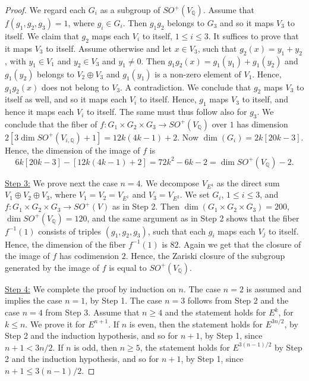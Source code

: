 \documentclass[12pt]{amsart}
\numberwithin{equation}{subsection}
\theoremstyle{plain}
\theoremstyle{definition}
\newcommand{\QQ}{{\mathbb Q}}
\newcommand{\ZZ}{{\mathbb Z}}
\newcommand{\Spin}{{\rm Spin}}
\begin{document}
\begin{proof}
We regard each $G_i$ as a subgroup of $SO^+(V_\QQ)$.
Assume that $f(g_1,g_2,g_3)=1$, where $g_i\in G_i$. Then $g_1g_2$ belongs to 
$G_3$ and so it maps $V_3$ to itself. We claim that $g_2$ maps each $V_i$ to itself, $1\leq i\leq 3$.
It suffices to prove that it maps $V_3$ to itself. Assume otherwise and let $x\in V_3$, such that $g_2(x)=y_1+y_2$, with $y_1\in V_1$ and $y_2\in V_3$ and $y_1\neq 0$. Then $g_1g_2(x)=g_1(y_1)+g_1(y_2)$ and $g_1(y_2)$ belongs to $V_2\oplus V_3$ and $g_1(y_1)$ is a non-zero element of $V_1$. Hence, $g_1g_2(x)$ does not belong to $V_3$. A contradiction. We conclude that $g_2$ maps $V_3$ to itself as well, and so it maps each $V_i$ to itself. Hence, $g_1$ maps $V_3$ to itself, and hence it maps each $V_i$ to itself.
The same must thus follow also for $g_3$. We conclude that the fiber of $f:{G}_1\times{G}_2\times{G}_3\rightarrow SO^+(V_\QQ)$ over $1$ 
has dimension $2[3\dim SO^+(V_{i,\QQ})+1]=12k(4k-1)+2$. Now $\dim({G}_i)=2k[20k-3]$. Hence, the dimension of the image of $f$ is
\[
6k[20k-3]-[12k(4k-1)+2]=72k^2-6k-2=\dim SO^+(V_\QQ)-2.
\]

\underline{Step 3:} We  prove next the case $n=4$.
We decompose $V_{E^4}$ as the direct sum $V_1\oplus V_2\oplus V_3$, where $V_1=V_2=V_{E^1}$ and $V_3=V_{E^2}$.
We set $G_i$, $1\leq i\leq 3$, and $f:G_1\times G_2\times G_3\rightarrow SO^+(V)$ as in Step 2. Then
$\dim({G}_1\times {G}_2 \times {G}_3)=200,$
$\dim SO^+(V_\QQ)=120$, and the same argument as in Step 2 shows that the 
fiber $f^{-1}(1)$ consists of triples $(g_1,g_2,g_3)$, such that each $g_i$ maps each $V_j$ to itself. Hence, the 
dimension of the fiber $f^{-1}(1)$ is $82$. Again we get that the closure of the image of $f$ has codimension $2$. Hence, 
the Zariski closure of the subgroup generated by the image of $f$ is equal to $SO^+(V_\QQ)$. 

\underline{Step 4:} We complete the proof by induction on $n$. The case $n=2$ is assumed and implies the case $n=1$, by Step 1.
The case $n=3$ follows from Step 2 and the case $n=4$ from Step 3. Assume that $n\geq 4$ and the statement holds for $E^k$,
for $k\leq n$. We prove it for $E^{n+1}$. If $n$ is even, then the statement holds for $E^{3n/2}$, by Step 2 and the induction hypothesis, and so for $n+1$, by Step 1, since $n+1<3n/2$. If $n$ is odd, then $n\geq 5$, the statement holds for $E^{3(n-1)/2}$
by Step 2 and the induction hypothesis, and so for $n+1$, by Step 1, since $n+1\leq 3(n-1)/2$.
\end{proof}
\end{document}
